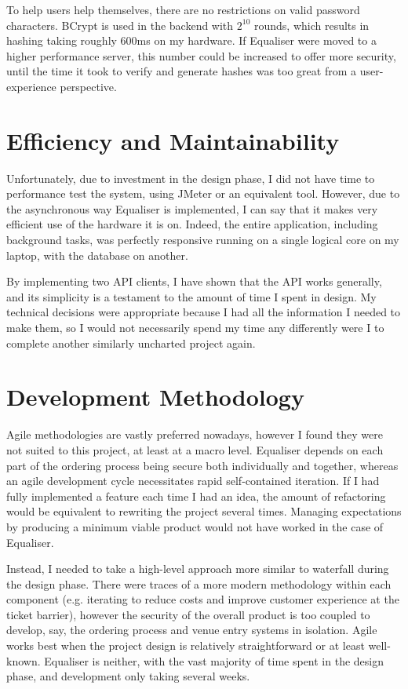 \documentclass[12pt,a4paper]{bhamdissertation}
\begin{document}
To help users help themselves, there are no restrictions on valid password characters. BCrypt is used in the backend with $2^{10}$ rounds, which results in hashing taking roughly 600ms on my hardware. If Equaliser were moved to a higher performance server, this number could be increased to offer more security, until the time it took to verify and generate hashes was too great from a user-experience perspective.

\section{Efficiency and Maintainability}

Unfortunately, due to investment in the design phase, I did not have time to performance test the system, using JMeter or an equivalent tool. However, due to the asynchronous way Equaliser is implemented, I can say that it makes very efficient use of the hardware it is on. Indeed, the entire application, including background tasks, was perfectly responsive running on a single logical core on my laptop, with the database on another.

By implementing two API clients, I have shown that the API works generally, and its simplicity is a testament to the amount of time I spent in design. My technical decisions were appropriate because I had all the information I needed to make them, so I would not necessarily spend my time any differently were I to complete another similarly uncharted project again.

\section{Development Methodology}

Agile methodologies are vastly preferred nowadays, however I found they were not suited to this project, at least at a macro level. Equaliser depends on each part of the ordering process being secure both individually and together, whereas an agile development cycle necessitates rapid self-contained iteration. If I had fully implemented a feature each time I had an idea, the amount of refactoring would be equivalent to rewriting the project several times. Managing expectations by producing a minimum viable product would not have worked in the case of Equaliser.

Instead, I needed to take a high-level approach more similar to waterfall during the design phase. There were traces of a more modern methodology within each component (e.g. iterating to reduce costs and improve customer experience at the ticket barrier), however the security of the overall product is too coupled to develop, say, the ordering process and venue entry systems in isolation. Agile works best when the project design is relatively straightforward or at least well-known. Equaliser is neither, with the vast majority of time spent in the design phase, and development only taking several weeks.
\end{document}
